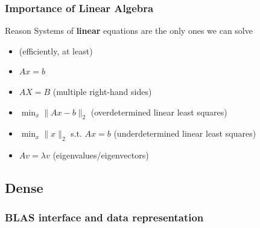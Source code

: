 \documentclass[xcolor={rgb,x11names,svgnames},rgb,x11names,svgnames]{beamer}
\begin{document}
\begin{frame}
  \frametitle{Importance of Linear Algebra}

  \begin{alertblock}{Reason}
  Systems of \textbf{linear} equations are the only ones we can solve
    \begin{itemize}
    \item (efficiently, at least)
    \end{itemize}
  \end{alertblock}

  \begin{itemize}
  \item $Ax = b$
  \item $AX = B$  \hfill (multiple right-hand sides)
  \item $\min_x \| Ax - b \|_2$ \hfill (overdetermined linear least squares)
  \item $\min_x \| x \|_2$ s.t. $Ax = b$ \hfill (underdetermined linear least squares)
  \item $Av = \lambda v$ \hfill (eigenvalues/eigenvectors)

  \end{itemize}

  \medskip

  \begin{center}
  \end{center}
\end{frame}


\subsection{Dense}
\subsubsection{BLAS interface and data representation}
\end{document}
